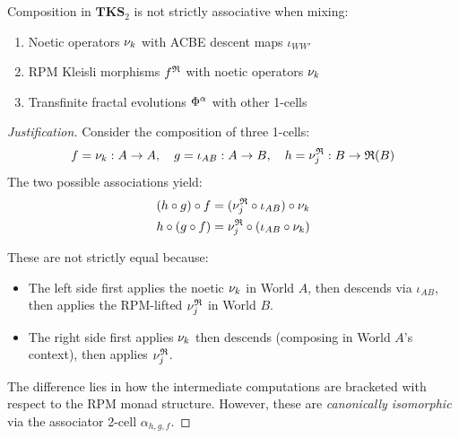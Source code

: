 \begin{proposition}
\label{prop:non-strict-assoc}
Composition in $\mathbf{TKS}_2$ is not strictly associative when mixing:
\begin{enumerate}[label=(\alph*)]
  \item Noetic operators $\nu_{k}$ with ACBE descent maps $\iota_{WW'}$
  \item RPM Kleisli morphisms $f^{\mathfrak{R}}$ with noetic operators $\nu_{k}$
  \item Transfinite fractal evolutions $\Phi^{\alpha}$ with other 1-cells
\end{enumerate}
\end{proposition}

\begin{proof}[Justification]
Consider the composition of three 1-cells:
\[
  f = \nu_{k} : A \to A, \quad
  g = \iota_{AB} : A \to B, \quad
  h = \nu_{j}^{\mathfrak{R}} : B \to \mathfrak{R}(B)
\]
The two possible associations yield:
\begin{align*}
  (h \circ g) \circ f &= (\nu_{j}^{\mathfrak{R}} \circ \iota_{AB}) \circ \nu_{k} \\
  h \circ (g \circ f) &= \nu_{j}^{\mathfrak{R}} \circ (\iota_{AB} \circ \nu_{k})
\end{align*}

These are not strictly equal because:
\begin{itemize}
  \item The left side first applies the noetic $\nu_{k}$ in World $A$, then descends
        via $\iota_{AB}$, then applies the RPM-lifted $\nu_{j}^{\mathfrak{R}}$ in World $B$.
  \item The right side first applies $\nu_{k}$ then descends (composing in World $A$'s
        context), then applies $\nu_{j}^{\mathfrak{R}}$.
\end{itemize}

The difference lies in how the intermediate computations are bracketed with respect
to the RPM monad structure. However, these are \emph{canonically isomorphic} via
the associator 2-cell $\alpha_{h,g,f}$.
\end{proof}

